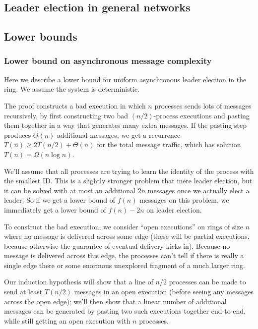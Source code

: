 \documentclass[11pt]{article}
\begin{document}
\subsection{Leader election in general networks}
\label{sec:org218a054}
\subsection{Lower bounds}
\label{sec:org4092bfe}
\subsubsection{Lower bound on asynchronous message complexity}
\label{sec:org3bbba1e}
Here we describe a lower bound for uniform asynchronous leader election in the ring. We assume the
system is deterministic.

The proof constructs a bad execution in which \(n\) processes sends lots of messages recursively, by
first constructing two bad \((n/2)\)-process executions and pasting them together in a way that
generates many extra messages. If the pasting step produces \(\Theta(n)\) additional messages, we get a
recurrence \(T(n)\ge 2T(n/2)+\Theta(n)\) for the total message traffic, which has solution \(T(n)=\Omega(n\log
        n)\).

We’ll assume that all processes are trying to learn the identity of the process with the smallest ID.
This is a slightly stronger problem that mere leader election, but it can be solved with at most an
additional \(2n\) messages once we actually elect a leader. So if we get a lower bound of \(f(n)\)
messages on this problem, we immediately get a lower bound of \(f(n)-2n\) on leader election.

To construct the bad execution, we consider “open executions” on rings of size \(n\) where no message is
delivered across some edge (these will be partial executions, because otherwise the guarantee of
eventual delivery kicks in). Because no message is delivered across this edge, the processes can’t
tell if there is really a single edge there or some enormous unexplored fragment of a much larger
ring.

Our induction hypothesis will show that a line of \(n/2\) processes can be made to send at least
\(T(n/2)\) messages in an open execution (before seeing any messages across the open edge); we’ll then
show that a linear number of additional messages can be generated by pasting two such executions
together end-to-end, while still getting an open execution with \(n\) processes.
\end{document}

